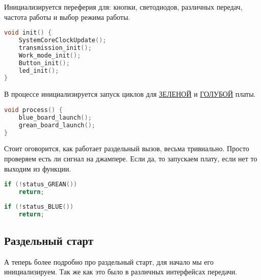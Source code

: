 \documentclass{bmstu}
\begin{document}
	Инициализируется переферия для: кнопки, светодиодов, различных передач, частота работы и выбор режима работы.
	
	\begingroup
	\fontsize{12pt}{12pt}\selectfont
	\begin{lstlisting}[language=C]
void init() {
	SystemCoreClockUpdate();
	transmission_init();
	Work_mode_init();
	Button_init();
	led_init();
}
	\end{lstlisting}
	\endgroup
	
	В процессе инициализируется запуск циклов для \underline{ЗЕЛЕНОЙ} и \underline{ГОЛУБОЙ} платы.

	\begingroup
	\fontsize{12pt}{12pt}\selectfont
	\begin{lstlisting}[language=C]
void process() {
	blue_board_launch();
	grean_board_launch();
}
	\end{lstlisting}
	\endgroup
	
	Стоит оговорится, как работает раздельный вызов, весьма тривиально. Просто проверяем есть ли сигнал на джампере. Если да, то запускаем плату, если нет то выходим из функции.
	
	\begingroup
	\fontsize{12pt}{12pt}\selectfont
	\begin{lstlisting}[language=C]
if (!status_GREAN())
	return;
	\end{lstlisting}
	\endgroup
	
	\begingroup
	\fontsize{12pt}{12pt}\selectfont
	\begin{lstlisting}[language=C]
if (!status_BLUE())
	return;
	\end{lstlisting}
	\endgroup
	
	\subsection{Раздельный старт}
	
	А теперь более подробно про раздельный старт, для начало мы его инициализируем. Так же как это было в различных интерфейсах передачи.
	
\end{document}
